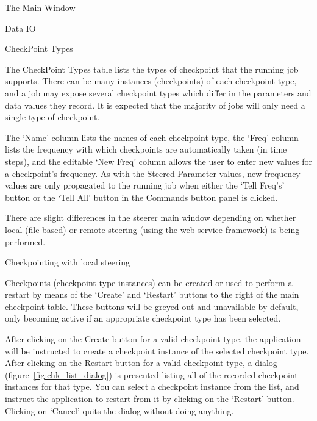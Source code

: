 \documentclass[a4paper,twoside]{article}
\begin{document}
\begin{section}{The Main Window}
\begin{subsection}{Data IO}
\end{subsection} %


\begin{subsection}{CheckPoint Types}

The CheckPoint Types table lists the types of checkpoint that the
running job supports. There can be many instances (checkpoints) of
each checkpoint type, and a job may expose several checkpoint types
which differ in the parameters and data values they record. It is expected
that the majority of jobs will only need a single type of checkpoint.

The `Name' column lists the names of each checkpoint type, the `Freq'
column lists the frequency with which checkpoints are automatically
taken (in time steps), and the editable `New Freq' column allows the user
to enter new values for a checkpoint's frequency. As with the Steered
Parameter values, new frequency values are only propagated to the
running job when either the `Tell Freq's' button or the `Tell All'
button in the Commands button panel is clicked.

There are slight differences in the steerer main window depending on
whether local (file-based) or remote steering (using the web-service
framework) is being performed.


\begin{subsubsection}{Checkpointing with local steering}

Checkpoints (checkpoint type instances) can be created or used to
perform a restart by means of the `Create' and `Restart' buttons to
the right of the main checkpoint table. These buttons will be greyed
out and unavailable by default, only becoming active if an appropriate
checkpoint type has been selected.

After clicking on the Create button for a valid checkpoint type, the
application will be instructed to create a checkpoint instance of the
selected checkpoint type.  After clicking on the Restart button for a
valid checkpoint type, a dialog (figure~\ref{fig:chk_list_dialog}) is
presented listing all of the recorded checkpoint instances for that
type. You can select a checkpoint instance from the list, and instruct
the application to restart from it by clicking on the `Restart'
button. Clicking on `Cancel' quits the dialog without doing anything.


\end{subsubsection}
\end{subsection}
\end{section}
\end{document}
